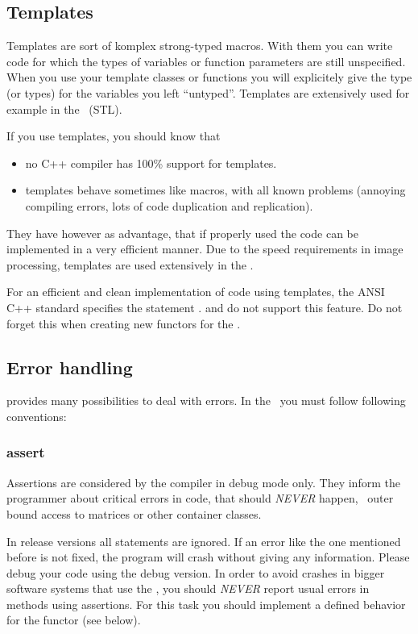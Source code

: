 \subsection{Templates}
\label{ssec:templates}

Templates are sort of komplex strong-typed macros.  With them you can write
code for which the types of variables or function parameters are still
unspecified.  When you use your template classes or functions you will
explicitely give the type (or types) for the variables you left ``untyped''.
Templates are extensively used for example in the \stl\ (STL).

If you use templates, you should know that
\begin{itemize}
\item no C++ compiler has 100\% support for templates.
\item templates behave sometimes like macros, with all known problems
  (annoying compiling errors, lots of code duplication and replication).
\end{itemize}

They have however as advantage, that if properly used the code can be
implemented in a very efficient manner.  Due to the speed requirements in
image processing, templates are used extensively in the \ltilib.

For an efficient and clean implementation of code using templates, the ANSI
C++ standard specifies the statement 
\cite{stroustrup}.  \visualc and  do not support this feature.
Do not forget this when creating new functors for the \ltilib.

\subsection{Error handling}

 provides many possibilities to deal with errors.  In the
\ltilib\ you must follow following conventions:

\subsubsection{assert}

Assertions are considered by the compiler in debug mode only.  They inform
the programmer about critical errors in code, that should \emph{NEVER} happen,
\eg\ outer bound access to matrices or other container classes.

In release versions all  statements are ignored.  If an error
like the one mentioned before is not fixed, the program will crash without
giving any information.  Please debug your code using the debug version.  In
order to avoid crashes in bigger software systems that use the \ltilib, you
should \emph{NEVER} report usual errors in  methods using
assertions.  For this task you should implement a defined behavior for the
functor (see below).

